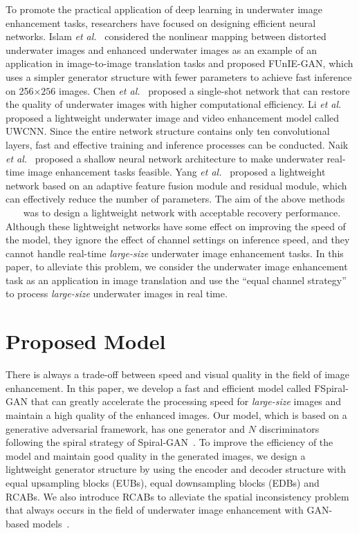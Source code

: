 \documentclass[utf8]{FrontiersinHarvard} %
\begin{document}
To promote the practical application of deep learning in underwater image enhancement tasks, researchers have focused on designing efficient neural networks. Islam \textit{et al.}~\citep{9001231} considered the nonlinear mapping between distorted underwater images and enhanced underwater images as an example of an application in image-to-image translation tasks and proposed FUnIE-GAN, which uses a simpler generator structure with fewer parameters to achieve fast inference on 256$\times 256$ images. Chen \textit{et al.}~\citep{8624564} proposed a single-shot network that can restore the quality of underwater images with higher computational efficiency. Li \textit{et al.}~\citep{2019Underwater1} proposed a lightweight underwater image and video enhancement model called UWCNN. Since the entire network structure contains only ten convolutional layers, fast and effective training and inference processes can be conducted. Naik \textit{et al.}~\citep{naik2021shallow} proposed a shallow neural network architecture to make underwater real-time image enhancement tasks feasible. Yang \textit{et al.}~\citep{2021LAFFNet} proposed a lightweight network based on an adaptive feature fusion module and residual module, which can effectively reduce the number of parameters. The aim of the above methods ~\citep{9001231}~\citep{8624564}~\citep{naik2021shallow} was to design a lightweight network with acceptable recovery performance. Although these lightweight networks have some effect on improving the speed of the model, they ignore the effect of channel settings on inference speed, and they cannot handle real-time \textit{large-size} underwater image enhancement tasks. In this paper, to alleviate this problem, we consider the underwater image enhancement task as an application in image translation and use the ``equal channel strategy'' to process \textit{large-size} underwater images in real time.
\section{Proposed Model}
There is always a trade-off between speed and visual quality in the field of image enhancement. In this paper, we develop a fast and efficient model called FSpiral-GAN that can greatly accelerate the processing speed for \textit{large-size} images and maintain a high quality of the enhanced images. Our model, which is based on a generative adversarial framework, has one generator and $N$ discriminators following the spiral strategy of Spiral-GAN~\citep{2020Underwater}. To improve the efficiency of the model and maintain good quality in the generated images, we design a lightweight generator structure by using the encoder and decoder structure with equal upsampling blocks (EUBs), equal downsampling blocks (EDBs) and RCABs. We also introduce RCABs to alleviate the spatial inconsistency problem that always occurs in the field of underwater image enhancement with GAN-based models~\citep{2021LAFFNet}.
\end{document}
